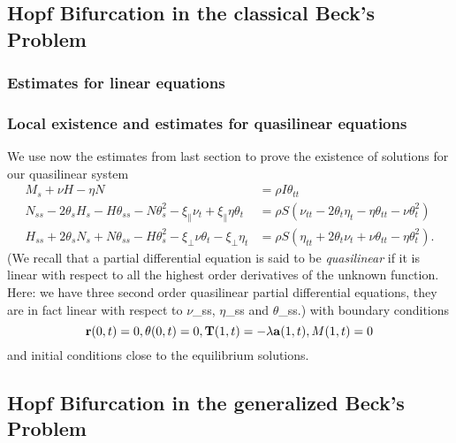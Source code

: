 
\subsection{Hopf Bifurcation in the classical Beck's Problem}
\subsubsection{Estimates for linear equations}
\subsubsection{Local existence and estimates for quasilinear equations}
We use now the estimates from last section to prove the existence of solutions for our quasilinear system
\[
\begin{align}
M_s + \nu H -\eta N 
&= \rho I \theta_{tt}\\
N_{ss} - 2\theta_sH_s - H\theta_{ss}- N\theta_s^2 
- \xi_{\parallel}\nu_t + \xi_{\parallel}\eta\theta_t
&= \rho S (\nu_{tt} - 2 \theta_t\eta_t - \eta\theta_{tt} - \nu\theta_t^2)\\
H_{ss} + 2\theta_sN_s + N\theta_{ss} - H\theta_s^2 
- \xi_{\perp}\nu\theta_t - \xi_{\perp}\eta_t
&= \rho S (\eta_{tt} + 2\theta_t\nu_t + \nu\theta_{tt} - \eta\theta_t^2).
\end{align}
\]
(We recall that a partial differential equation is said to be \emph{quasilinear} if it is linear with respect to all the highest order derivatives of the unknown function. Here: we have three second order quasilinear partial differential equations, they are in fact linear with respect to $\nu$_{ss}, $\eta$_{ss} and  $\theta$_{ss}.)
with boundary conditions
\[
\mathbf{r}(0,t)= 0,\\
\theta(0,t) = 0,\\
\mathbf{T}(1,t) = -\lambda \mathbf{a}(1,t),\\
M(1,t) = 0\\
\]
and initial conditions close to the equilibrium solutions.

\subsection{Hopf Bifurcation in the generalized Beck's Problem}
